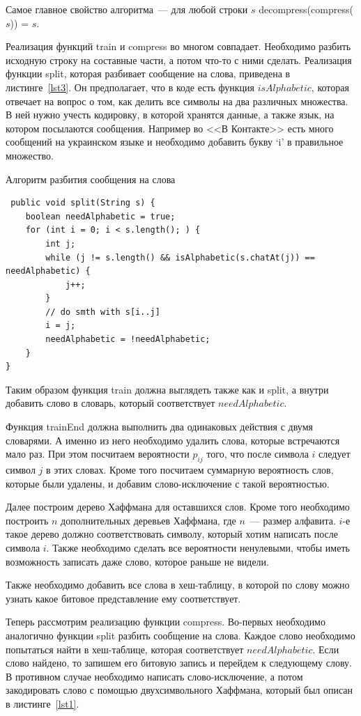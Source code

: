 Самое главное свойство алгоритма~--- для любой строки $s$ decompress(compress($s$)) = $s$.

Реализация функций train и compress во многом совпадает. Необходимо разбить исходную строку на составные части, а потом что-то с ними сделать.
Реализация функции split, которая разбивает сообщение на слова, приведена в листинге~\ref{lst3}. Он предполагает, что в коде есть функция $isAlphabetic$, которая отвечает на вопрос о том, 
как делить все символы на два различных множества. В ней нужно учесть кодировку, в которой хранятся данные, а также язык, на котором 
посылаются сообщения. Например во <<В Контакте>> есть много сообщений на украинском языке и необходимо добавить букву `i' в правильное множество.

\begin{algorithm}[!h]
\caption{Алгоритм разбития сообщения на слова}\label{lst3}
\begin{lstlisting}
 public void split(String s) {
 	boolean needAlphabetic = true;
 	for (int i = 0; i < s.length(); ) {
 		int j;
 		while (j != s.length() && isAlphabetic(s.chatAt(j)) == needAlphabetic) {
 			j++;
 		}
 		// do smth with s[i..j]
 		i = j;
 		needAlphabetic = !needAlphabetic;
 	}
}
\end{lstlisting}
\end{algorithm}

Таким образом функция train должна выглядеть также как и split, а внутри добавить слово в словарь, который соответствует $needAlphabetic$.

Функция trainEnd должна выполнить два одинаковых действия с двумя словарями. А именно из него необходимо удалить слова, которые встречаются мало раз.
При этом посчитаем вероятности $p_{ij}$ того, что после символа $i$ следует символ $j$ в этих словах. Кроме того посчитаем суммарную вероятность слов,
которые были удалены, и добавим слово-исключение с такой вероятностью.

Далее построим дерево Хаффмана для оставшихся слов. Кроме того необходимо построить $n$ дополнительных деревьев Хаффмана, где $n$~--- размер алфавита. 
$i$-е такое дерево должно соответствовать символу, который хотим написать после символа $i$. Также необходимо сделать все вероятности ненулевыми, чтобы
иметь возможность записать даже слово, которое раньше не видели.

Также необходимо добавить все слова в хеш-таблицу, в которой по слову можно узнать какое битовое представление ему соответствует.

Теперь рассмотрим реализацию функции compress. Во-первых необходимо аналогично функции split разбить сообщение на слова. Каждое слово необходимо
попытаться найти в хеш-таблице, которая соответствует $needAlphabetic$. Если слово найдено, то запишем его битовую запись и перейдем к следующему слову.
В противном случае необходимо написать слово-исключение, а потом закодировать слово с помощью двухсимвольного Хаффмана, который был описан в листинге~\ref{lst1}.


